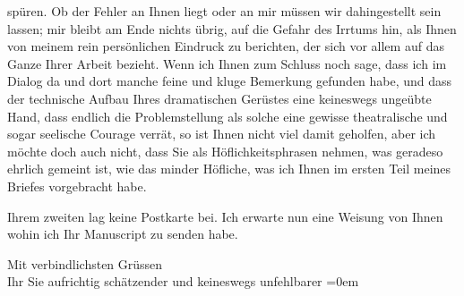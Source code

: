                spüren. Ob der Fehler an Ihnen liegt oder an mir müssen wir dahingestellt sein
               lassen; mir bleibt am Ende nichts übrig, auf die Gefahr des Irrtums hin, als Ihnen
               von meinem rein persönlichen Eindruck zu berichten, der sich vor
               allem auf das Ganze
               Ihrer Arbeit bezieht. Wenn ich Ihnen zum Schluss noch sage, dass ich im Dialog da und
               dort manche feine und kluge Bemerkung gefunden habe, und dass der technische Aufbau
               Ihres dramatischen Gerüstes eine keineswegs ungeübte Hand, dass endlich die
               Problemstellung als solche eine gewisse theatralische und sogar seelische Courage
               verrät, so ist Ihnen nicht viel damit geholfen, aber ich möchte doch auch nicht, dass
               Sie als Höflichkeitsphrasen nehmen, was geradeso ehrlich gemeint ist, wie das minder
               Höfliche, was ich Ihnen im ersten Teil meines Briefes vorgebracht habe.\pend
           
\pstart
           {\pb}Ihrem zweiten \label{K_L04340-2v}\label{K_L04340-2} lag keine Postkarte bei.
               Ich erwarte nun eine Weisung von Ihnen wohin ich Ihr Manuscript zu senden habe.\pend
           
\pstart
           Mit verbindlichsten Grüssen{\\[\baselineskip]}Ihr Sie aufrichtig schätzender und keineswegs
               unfehlbarer\pend
           \leftskip=0em{}\endnumbering{}  \newcommand{\dateiname}{L04340}\newcommand{\titel}{Arthur Schnitzler an Elsa Ginsberg-Plessner, 17. 1. 1916}\newcommand{\editorInnen}{Herausgegeben von Jahnke, SelmaMüller, Martin Anton}
